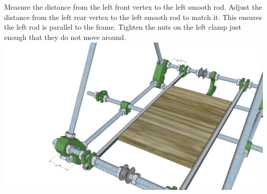 \documentclass[twoside,openany,a4paper,titlepage]{memoir}
\begin{document}
	\section{}
	Measure the distance from the left front vertex to the left smooth rod. Adjust the distance from the left
	rear vertex to the left smooth rod to match it. This ensures the left rod is parallel to the frame. Tighten
	the nuts on the left clamp just enough that they do not move around.\\
	\includegraphics[width=1\linewidth]{graphics/ch6_7_1.png}
\end{document}
